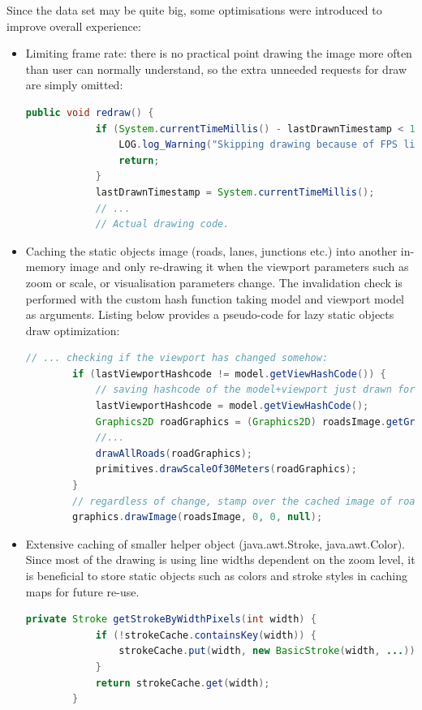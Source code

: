 Since the data set may be quite big, some optimisations were introduced to improve overall experience:
\begin{itemize}
    \item Limiting frame rate: there is no practical point drawing the image more often than user can normally understand, so the extra unneeded requests for draw are simply omitted:
    \begin{lstlisting}[language=java]
        public void redraw() {
            if (System.currentTimeMillis() - lastDrawnTimestamp < 1000 / MAX_FRAME_RATE) {
                LOG.log_Warning("Skipping drawing because of FPS limitation.");
                return;
            }
            lastDrawnTimestamp = System.currentTimeMillis();
            // ...
            // Actual drawing code.
    \end{lstlisting}

    \item Caching the static objects image (roads, lanes, junctions etc.) into another in-memory image and only re-drawing it when the viewport parameters such as zoom or scale, or visualisation parameters change. The invalidation check is performed with the custom hash function taking model and viewport model as arguments. Listing below provides a pseudo-code for lazy static objects draw optimization:
    \begin{lstlisting}[language=java]
        // ... checking if the viewport has changed somehow:
        if (lastViewportHashcode != model.getViewHashCode()) {
            // saving hashcode of the model+viewport just drawn for future check
            lastViewportHashcode = model.getViewHashCode();
            Graphics2D roadGraphics = (Graphics2D) roadsImage.getGraphics();
            //...
            drawAllRoads(roadGraphics);
            primitives.drawScaleOf30Meters(roadGraphics);
        }
        // regardless of change, stamp over the cached image of roads onto resulting image
        graphics.drawImage(roadsImage, 0, 0, null);
    \end{lstlisting}
    \item Extensive caching of smaller helper object (java.awt.Stroke, java.awt.Color). Since most of the drawing is using line widths dependent on the zoom level, it is beneficial to store static objects such as colors and stroke styles in caching maps for future re-use.
    \begin{lstlisting}[language=java]
        private Stroke getStrokeByWidthPixels(int width) {
            if (!strokeCache.containsKey(width)) {
                strokeCache.put(width, new BasicStroke(width, ...));
            }
            return strokeCache.get(width);
        }
    \end{lstlisting}
\end{itemize}



